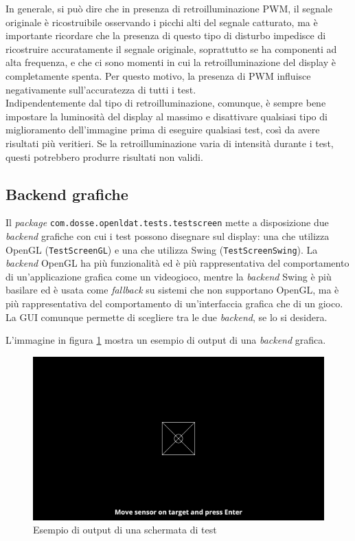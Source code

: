 In generale, si può dire che in presenza di retroilluminazione PWM, il segnale originale è ricostruibile osservando i picchi alti del segnale catturato, ma è importante ricordare che la presenza di questo tipo di disturbo impedisce di ricostruire accuratamente il segnale originale, soprattutto se ha componenti ad alta frequenza, e che ci sono momenti in cui la retroilluminazione del display è completamente spenta. Per questo motivo, la presenza di PWM influisce negativamente sull'accuratezza di tutti i test.\\
Indipendentemente dal tipo di retroilluminazione, comunque, è sempre bene impostare la luminosità del display al massimo e disattivare qualsiasi tipo di miglioramento dell'immagine prima di eseguire qualsiasi test, così da avere risultati più veritieri. Se la retroilluminazione varia di intensità durante i test, questi potrebbero produrre risultati non validi.

\subsection{Backend grafiche}
Il \textit{package} \texttt{com.dosse.openldat.tests.testscreen} mette a disposizione due \textit{backend} grafiche con cui i test possono disegnare sul display: una che utilizza OpenGL (\texttt{TestScreenGL}) e una che utilizza Swing (\texttt{TestScreenSwing}). La \textit{backend} OpenGL ha più funzionalità ed è più rappresentativa del comportamento di un'applicazione grafica come un videogioco, mentre la \textit{backend} Swing è più basilare ed è usata come \textit{fallback} su sistemi che non supportano OpenGL, ma è più rappresentativa del comportamento di un'interfaccia grafica che di un gioco. La GUI comunque permette di scegliere tra le due \textit{backend}, se lo si desidera.

L'immagine in figura \ref{fig:testscreen_example} mostra un esempio di output di una \textit{backend} grafica.

\begin{figure}[h]
	\centering
	\includegraphics[width=\textwidth]{Applicazione_files/testscreen_example.png}
	\caption{Esempio di output di una schermata di test}
	\label{fig:testscreen_example}
\end{figure}

